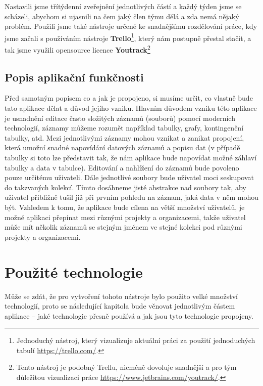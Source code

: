 \par Nastavili jsme třítýdenní zveřejnění jednotlivých částí a každý týden jsme se scházeli, abychom si ujasnili na čem jaký člen týmu dělá a zda nemá nějaký problém. Použili jsme také nástroje určené ke snadnějšímu rozdělování práce, kdy jsme začali s používáním nástroje \textbf{Trello}\footnote{Jednoduchý nástroj, který vizualizuje aktuální práci za použití jednoduchých tabulí \url{https://trello.com/}.}, který nám postupně přestal stačit, a tak jsme využili opensource licence \textbf{Youtrack}\footnote{Tento nástroj je podobný Trellu, nicméně dovoluje snadnější a pro tým důležitou vizualizaci práce \url{https://www.jetbrains.com/youtrack/}.}

\subsection{Popis aplikační funkčnosti}
\par Před samotným popisem co a jak je propojeno, si musíme určit, co vlastně bude tato aplikace dělat a důvod jejího vzniku. Hlavním důvodem vzniku této aplikace je usnadnění editace často složitých záznamů (souborů) pomocí moderních technologií, záznamy můžeme rozumět například tabulky, grafy, kontingenční tabulky, atd. Mezi jednotlivými záznamy mohou vznikat a zanikat propojení, která umožní snadné napovídání datových záznamů a popisu dat (v případě tabulky si toto lze představit tak, že nám aplikace bude napovídat možné záhlaví tabulky a data v tabulce). Editování a nahlížení do záznamů bude povoleno pouze určitému uživateli. Dále jednotlivé soubory bude uživatel moci seskupovat do takzvaných kolekcí. Tímto dosáhneme jisté abstrakce nad soubory tak, aby uživatel přibližně tušil již při prvním pohledu na záznam, jaká data v něm mohou být. Vzhledem k tomu, že aplikace bude cílena na větší množství uživatelů, je možné aplikaci přepínat mezi různými projekty a organizacemi, takže uživatel může mít několik záznamů se stejným jménem ve stejné kolekci pod různými projekty a organizacemi.

\section{Použité technologie}
\par Může se zdát, že pro vytvoření tohoto nástroje bylo použito velké množství technologií, proto se následující kapitola bude věnovat jednotlivým částem aplikace -- jaké technologie přesně používá a jak jsou tyto technologie propojeny.

